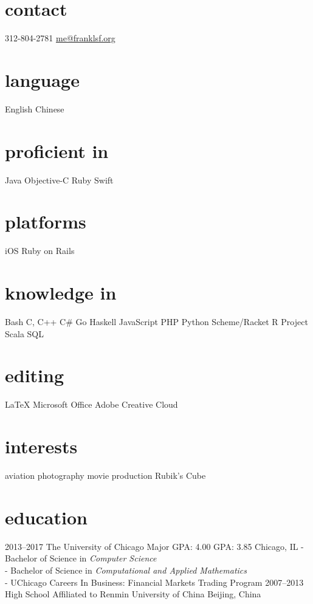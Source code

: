 



\begin{aside} %
\section{contact}
312-804-2781
\underline{me@franklsf.org}
\section{language}
English
Chinese
\section{proficient in}
Java
Objective-C
Ruby
Swift
\section{platforms}
iOS
Ruby on Rails
\section{knowledge in}
Bash
C, C++
C\#
Go
Haskell
JavaScript
PHP
Python
Scheme/Racket
R Project
Scala
SQL
\section{editing}
{\LaTeX}
Microsoft Office
Adobe Creative Cloud
\section{interests}
aviation
photography
movie production
Rubik’s Cube
\end{aside}

\section{education}

\begin{entrylist}
\entry
{2013--2017}
{The University of Chicago}
{Major GPA: 4.00\hspace{2em} GPA: 3.85\hspace{2em} Chicago, IL}
{- Bachelor of Science in \emph{Computer Science} \\
 - Bachelor of Science in \emph{Computational and Applied Mathematics} \\
 - UChicago Careers In Business: Financial Markets Trading Program}
\entry
{2007--2013}
{High School Affiliated to Renmin University of China}
{Beijing, China}
{}
\end{entrylist}

